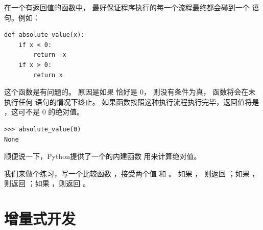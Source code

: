 
在一个有返回值的函数中， 最好保证程序执行的每一个流程最终都会碰到一个  语句。例如：

\begin{lstlisting}
def absolute_value(x):
    if x < 0:
        return -x
    if x > 0:
        return x
\end{lstlisting}

%

这个函数是有问题的。 原因是如果  恰好是 0， 则没有条件为真， 函数将会在未执行任何  语句的情况下终止。 如果函数按照这种执行流程执行完毕，返回值将是  ，这可不是 0 的绝对值。
  

\begin{lstlisting}
>>> absolute_value(0)
None
\end{lstlisting}

%

顺便说一下，Python提供了一个的内建函数  用来计算绝对值。
  


我们来做个练习，写一个比较函数  ，接受两个值  和  。
如果 ， 则返回  ；如果 ， 则返回  ；如果 ，则返回  。
  


\section{增量式开发}
\label{incremental.development}
  

